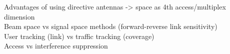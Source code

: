 Advantages of using directive antennas -> space as 4th access/multiplex dimension\\

Beam space vs signal space methods (forward-reverse link sensitivity)\\

User tracking (link) vs traffic tracking (coverage)\\

Access vs interference suppression
